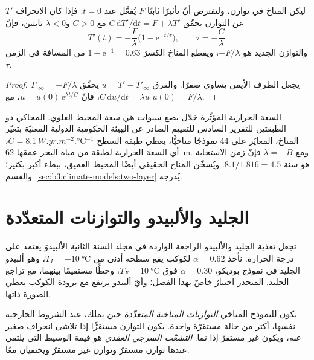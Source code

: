 \begin{theorem}\label{thm:b3:climate-models:response}
ليكن المناخ في توازن، ولنفترض أنّ تأثيرًا ثابتًا $F$ يُفعَّل
عند $t = 0$. فإذا كان الانحراف $T'$ عن التوازن يحقّق $C\,\mathrm
dT'/\mathrm dt = F + \lambda T'$ مع $C > 0$ و$\lambda < 0$ ثابتين،
فإنّ
\[
T'(t) = -\frac{F}{\lambda}\Big(1 - \mathrm e^{-t/\tau}\Big), \qquad
\tau = -\frac{C}{\lambda} .
\]
والتوازن الجديد هو $-F/\lambda$، ويقطع المناخ الكسرَ $1
- \mathrm e^{-1} = \num{0.63}$ من المسافة في الزمن $\tau$.
\end{theorem}

\begin{proof}
$T'_\infty = -F/\lambda$ يجعل الطرف الأيمن يساوي صفرًا. والفرق
$u = T' - T'_\infty$ يحقّق $C\,\mathrm du/\mathrm dt = \lambda u$، فإنّ $u =
u(0)\,\mathrm e^{\lambda t/C}$، مع $u(0) = F/\lambda$.
\end{proof}

السعة الحرارية المؤثّرة خلال بضع سنوات هي سعة المحيط العلوي.
المحاكي ذو الطبقتين للتقرير السادس للتقييم الصادر عن الهيئة
الحكومية الدولية المعنيّة بتغيّر المناخ، المعايَر على 44 نموذجًا مناخيًّا،
يعطي طبقة السطح $C = \qty{8.1}{W.yr.m^{-2}.\celsius^{-1}}$، أي السعة الحرارية
لطبقة من مياه البحر عمقها \qty{62}{m}. ومع $\lambda = -B$ فإنّ
زمن الاستجابة هو $8.1/1.816 = \num{4.5}\text{ سنة}$. ويُسخّن المناخ الحقيقي أيضًا
المحيط العميق، ببطء أكبر بكثير؛ والقسم~\ref{sec:b3:climate-models:two-layer}
يُدرجه.

\section{الجليد والألبيدو والتوازنات المتعدّدة}\label{sec:b3:climate-models:multiple}

تجعل تغذية الجليد والألبيدو الراجعة الواردة في مجلد السنة الثانية الألبيدوَ يعتمد على
درجة الحرارة. نأخذ $\alpha = 0.62$ لكوكب يقع سطحه أدنى من
$T_I = \qty{-10}{\celsius}$، وهو ألبيدو الجليد في نموذج بوديكو، $\alpha
= 0.30$ فوق $T_F = \qty{+10}{\celsius}$، وخطًّا مستقيمًا بينهما، مع تراجع الجليد.
المنحدر اختيارٌ خاصّ بهذا الفصل؛ وأيّ ألبيدو يرتفع
مع برودة الكوكب يعطي الصورة ذاتها.

\begin{definition}\label{def:b3:climate-models:multiple-equilibria}
يكون للنموذج المناخي \emph{التوازنات المناخية المتعدّدة}
حين يملك، عند الشروط الخارجية نفسها، أكثر من
حالة مستقرّة واحدة. يكون التوازن مستقرًّا إذا تلاشى انحراف صغير عنه،
ويكون غير مستقرّ إذا نما. \emph{التشعّب السرجي
العقدي} هو قيمة الوسيط التي
يلتقي عندها توازن مستقرّ وتوازن غير مستقرّ ويختفيان معًا.
\end{definition}

